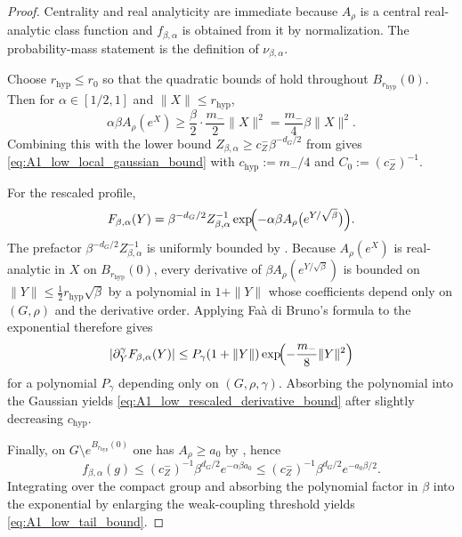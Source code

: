 \begin{proof}
Centrality and real analyticity are immediate because $A_\rho$ is a central real-analytic class function and $f_{\beta,\alpha}$ is obtained from it by normalization.
The probability-mass statement is the definition of $\nu_{\beta,\alpha}$.

Choose $r_{\mathrm{hyp}}\le r_0$ so that the quadratic bounds of  hold throughout $B_{r_{\mathrm{hyp}}}(0)$.
Then for $\alpha\in[1/2,1]$ and $\|X\|\le r_{\mathrm{hyp}}$,
\[
\alpha\beta A_\rho(e^X)
\ge
\frac{\beta}{2}\cdot \frac{m_-}{2}\|X\|^2
=
\frac{m_-}{4}\beta\|X\|^2.
\]
Combining this with the lower bound $Z_{\beta,\alpha}\ge c_Z^-\beta^{-d_G/2}$ from  gives \eqref{eq:A1_low_local_gaussian_bound} with
$c_{\mathrm{hyp}}:=m_-/4$ and $C_0:=(c_Z^-)^{-1}$.

For the rescaled profile,
\[
F_{\beta,\alpha}(Y)
=
\beta^{-d_G/2}Z_{\beta,\alpha}^{-1}
\exp\!\Bigl(-\alpha\beta A_\rho\bigl(e^{Y/\sqrt{\beta}}\bigr)\Bigr).
\]
The prefactor $\beta^{-d_G/2}Z_{\beta,\alpha}^{-1}$ is uniformly bounded by .
Because $A_\rho(e^X)$ is real-analytic in $X$ on $B_{r_{\mathrm{hyp}}}(0)$, every derivative of
$\beta A_\rho(e^{Y/\sqrt{\beta}})$ is bounded on $\|Y\|\le \frac12 r_{\mathrm{hyp}}\sqrt{\beta}$ by a polynomial in $1+\|Y\|$ whose coefficients depend only on $(G,\rho)$ and the derivative order.
Applying Fa\`a di Bruno's formula to the exponential therefore gives
\[
|\partial_Y^\gamma F_{\beta,\alpha}(Y)|
\le
P_\gamma(1+\|Y\|)
\exp\!\Bigl(-\frac{m_-}{8}\|Y\|^2\Bigr)
\]
for a polynomial $P_\gamma$ depending only on $(G,\rho,\gamma)$.
Absorbing the polynomial into the Gaussian yields \eqref{eq:A1_low_rescaled_derivative_bound} after slightly decreasing $c_{\mathrm{hyp}}$.

Finally, on $G\setminus e^{B_{r_{\mathrm{hyp}}}(0)}$ one has $A_\rho\ge a_0$ by , hence
\[
f_{\beta,\alpha}(g)
\le
(c_Z^-)^{-1}\beta^{d_G/2}e^{-\alpha\beta a_0}
\le
(c_Z^-)^{-1}\beta^{d_G/2}e^{-a_0\beta/2}.
\]
Integrating over the compact group and absorbing the polynomial factor in $\beta$ into the exponential by enlarging the weak-coupling threshold yields \eqref{eq:A1_low_tail_bound}.
\end{proof}

